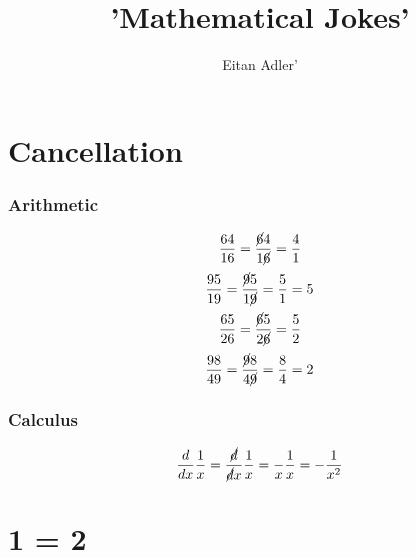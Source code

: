 \documentclass{article}
\title{'Mathematical Jokes'}
\author{Eitan Adler'}
\begin{document}
\maketitle


\section{Cancellation}
\subsubsection{Arithmetic}
\begin{equation}
	\begin{split}
		\frac{64}{16}
		=
		\frac{\cancel{6}4}{1\cancel{6}}
		=
		\frac{4}{1}
	\end{split}
\end{equation}
\begin{equation}
	\begin{split}
		\frac{95}{19}
		=
		\frac{\cancel{9}5}{1\cancel{9}}
		=
		\frac{5}{1}
		=
		5
	\end{split}
\end{equation}
\begin{equation}
	\begin{split}
		\frac{65}{26}
		=
		\frac{\cancel{6}5}{2\cancel{6}}
		=
		\frac{5}{2}
	\end{split}
\end{equation}
\begin{equation}
	\begin{split}
		\frac{98}{49}
		=
		\frac{\cancel{9}8}{4\cancel{9}}
		=
		\frac{8}{4}
		=
		2
	\end{split}
\end{equation}

\subsubsection{Calculus}
\begin{equation}
	\begin{split}
		\frac{d}{dx}
		\frac{1}{x}
		=
		\frac{\cancel{d}}{\cancel{d}x}
		\frac{1}{x}
		=
		\frac{}{x}
		\frac{1}{x}
		=
		- \frac{1}{x^2}
	\end{split}
\end{equation}

\section{1 = 2}
\end{document}
